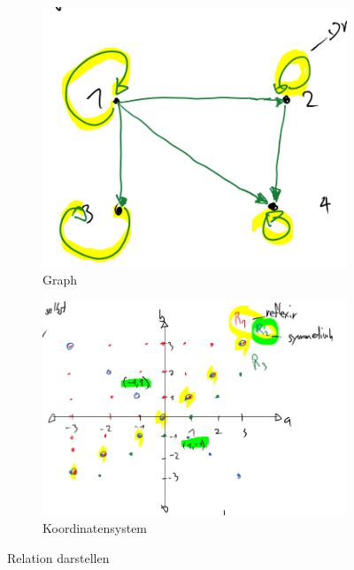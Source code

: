 \begin{figure}[h!]
	\centering
	\begin{subfigure}[b]{0.27\textwidth}
		\includegraphics[width=\textwidth]{fig/knoten_kanten.png}
		\caption{Graph}
		\label{fig:relation-knoten-kanten}
	\end{subfigure}
	\begin{subfigure}[b]{0.3\textwidth}
		\includegraphics[width=\textwidth]{fig/koordinatensystem.png}
		\caption{Koordinatensystem}
		\label{fig:relation-koordinatensystem}
	\end{subfigure}
	\caption{Relation darstellen}
	\label{fig:relation-funktion}
\end{figure} 

